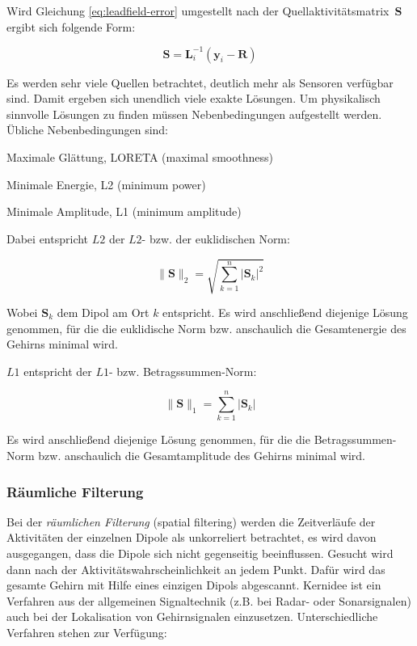 \documentclass[doc,a4paper,12pt]{apa6}
\newcommand{\mx}[1]{\mathbf{#1}}
\begin{document}
Wird Gleichung \ref{eq:leadfield-error} umgestellt nach der Quellaktivitätsmatrix~$\mx{S}$ ergibt sich folgende Form:

\begin{equation}
\mx{S} = \mx{L}_i^{-1} ( \mx{y}_i - \mx{R} )
\end{equation}

Es werden sehr viele Quellen betrachtet, deutlich mehr als Sensoren verfügbar sind. Damit ergeben sich unendlich viele exakte Lösungen. Um physikalisch sinnvolle Lösungen zu finden müssen Nebenbedingungen aufgestellt werden. Übliche Nebenbedingungen sind:

\begin{compactitem}
\item Maximale Glättung, LORETA (maximal smoothness)
\item Minimale Energie, L2 (minimum power)
\item Minimale Amplitude, L1 (minimum amplitude)
\end{compactitem}

Dabei entspricht $L2$ der $L2$- bzw. der euklidischen Norm:

\begin{equation}
\|\mx{S}\|_2 = \sqrt{\sum_{k=1}^n |\mx{S}_k|^2}
\end{equation}

Wobei $\mx{S}_k$ dem Dipol am Ort $k$ entspricht. Es wird anschließend diejenige Lösung genommen, für die die euklidische Norm bzw. anschaulich die Gesamtenergie des Gehirns minimal wird.

$L1$ entspricht der $L1$- bzw. Betragssummen-Norm:

\begin{equation}
\|\mx{S}\|_1 = \sum_{k=1}^n |\mx{S}_k|
\end{equation}

Es wird anschließend diejenige Lösung genommen, für die die Betragssummen-Norm bzw. anschaulich die Gesamtamplitude des Gehirns minimal wird.

\subsubsection{Räumliche Filterung}
\label{sec:beam}

Bei der \emph{räumlichen Filterung} (spatial filtering) werden die Zeitverläufe der Aktivitäten der einzelnen Dipole als unkorreliert betrachtet, es wird davon ausgegangen, dass die Dipole sich nicht gegenseitig beeinflussen. Gesucht wird dann nach der Aktivitätswahrscheinlichkeit an jedem Punkt. Dafür wird das gesamte Gehirn mit Hilfe eines einzigen Dipols abgescannt. Kernidee ist ein Verfahren aus der allgemeinen Signaltechnik (z.B. bei Radar- oder Sonarsignalen) auch bei der Lokalisation von Gehirnsignalen einzusetzen. Unterschiedliche Verfahren stehen zur Verfügung:
\end{document}
